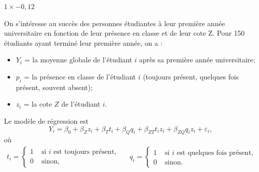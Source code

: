 \begin{questions}
\begin{parts}
    \begin{solution}
        $1 \times -0,12$
    \end{solution}
\end{parts}

\newpage
\question\label{interactionEThypotheses}
On s'intéresse au succès des personnes étudiantes à leur première année universitaire en fonction de leur présence en classe et de leur cote Z. Pour 150 étudiants ayant terminé leur première année, on a :
\begin{itemize}
    \item $Y_i$ = la moyenne globale de l’étudiant $i$ après sa première année universitaire;
    \item $p_i$ = la présence en classe de l'étudiant $i$ (toujours présent, quelques fois présent, souvent absent);
    \item $z_i$ = la cote $Z$ de l'étudiant $i$.
\end{itemize}
Le modèle de régression  est 
\begin{equation}\label{eq:modeleInteraction}
    Y_i=\beta_0 + \beta_Z z_i + \beta_{T} t_{i} + \beta_Q q_i + \beta_{ZT}t_i z_i+ \beta_{ZQ}q_i z_i + \varepsilon_i,
\end{equation}
où 
\begin{align*}
    t_i =\left\{
			\begin{array}{ll}
			1  & \mbox{ si $i$ est toujours présent}, \\
			0 & \mbox{ sinon, }
   \end{array}
			\right. & & q_i =\left\{
			\begin{array}{ll}
			1  & \mbox{ si $i$ est quelques fois présent}, \\
			0 & \mbox{ sinon. }
   \end{array}
			\right. 
\end{align*}

\vspace{0.25cm}
\end{questions}
